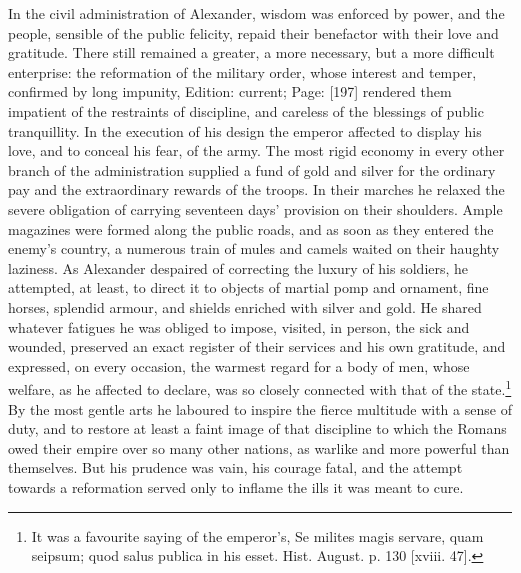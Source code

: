 In the civil administration of Alexander, wisdom was enforced by power, and the people, sensible of the public felicity, repaid their benefactor with their love and gratitude. There still remained a greater, a more necessary, but a more difficult enterprise: the reformation of the military order, whose interest and temper, confirmed by long impunity, Edition: current; Page: [197] rendered them impatient of the restraints of discipline, and careless of the blessings of public tranquillity. In the execution of his design the emperor affected to display his love, and to conceal his fear, of the army. The most rigid economy in every other branch of the administration supplied a fund of gold and silver for the ordinary pay and the extraordinary rewards of the troops. In their marches he relaxed the severe obligation of carrying seventeen days\texthebrew{}’ provision on their shoulders. Ample magazines were formed along the public roads, and as soon as they entered the enemy\texthebrew{}’s country, a numerous train of mules and camels waited on their haughty laziness. As Alexander despaired of correcting the luxury of his soldiers, he attempted, at least, to direct it to objects of martial pomp and ornament, fine horses, splendid armour, and shields enriched with silver and gold. He shared whatever fatigues he was obliged to impose, visited, in person, the sick and wounded, preserved an exact register of their services and his own gratitude, and expressed, on every occasion, the warmest regard for a body of men, whose welfare, as he affected to declare, was so closely connected with that of the state.\footnote{It was a favourite saying of the emperor\texthebrew{}’s, Se milites magis servare, quam seipsum; quod salus publica in his esset. Hist. August. p. 130 [xviii. 47].} By the most gentle arts he laboured to inspire the fierce multitude with a sense of duty, and to restore at least a faint image of that discipline to which the Romans owed their empire over so many other nations, as warlike and more powerful than themselves. But his prudence was vain, his courage fatal, and the attempt towards a reformation served only to inflame the ills it was meant to cure.


